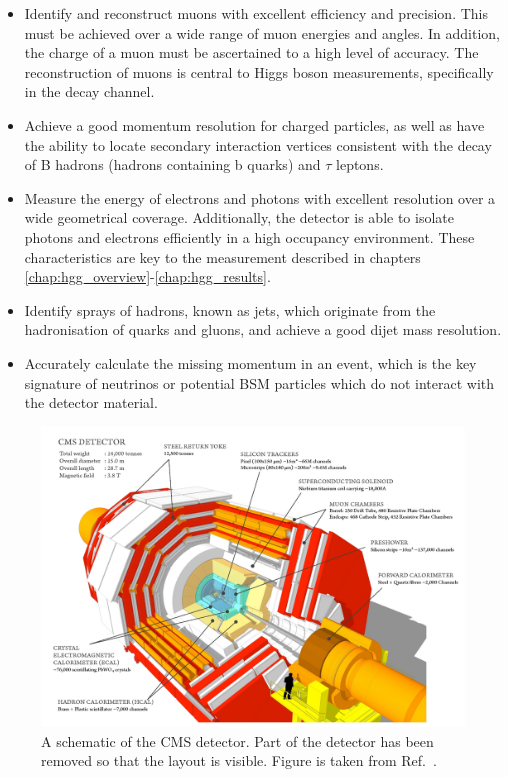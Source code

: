 \begin{itemize}
    \item Identify and reconstruct muons with excellent efficiency and precision. This must be achieved over a wide range of muon energies and angles. In addition, the charge of a muon must be ascertained to a high level of accuracy. The reconstruction of muons is central to Higgs boson measurements, specifically in the \Hfl decay channel.
    \item Achieve a good momentum resolution for charged particles, as well as have the ability to locate secondary interaction vertices consistent with the decay of B hadrons (hadrons containing b quarks) and $\tau$ leptons.
    \item Measure the energy of electrons and photons with excellent resolution over a wide geometrical coverage. Additionally, the detector is able to isolate photons and electrons efficiently in a high occupancy environment. These characteristics are key to the \Hgg measurement described in chapters \ref{chap:hgg_overview}-\ref{chap:hgg_results}.
    \item Identify sprays of hadrons, known as jets, which originate from the hadronisation of quarks and gluons, and achieve a good dijet mass resolution.
    \item Accurately calculate the missing momentum in an event, which is the key signature of neutrinos or potential BSM particles which do not interact with the detector material.
\end{itemize}

\begin{figure}[htb!]
  \centering
  \includegraphics[width=1\textwidth]{Figures/cms/cms_detector.pdf}
  \caption[The CMS detector]
  {
    A schematic of the CMS detector. Part of the detector has been removed so that the layout is visible. Figure is taken from Ref.~\cite{Sakuma_2014}.
  }
  \label{fig:cms_detector}
\end{figure}

